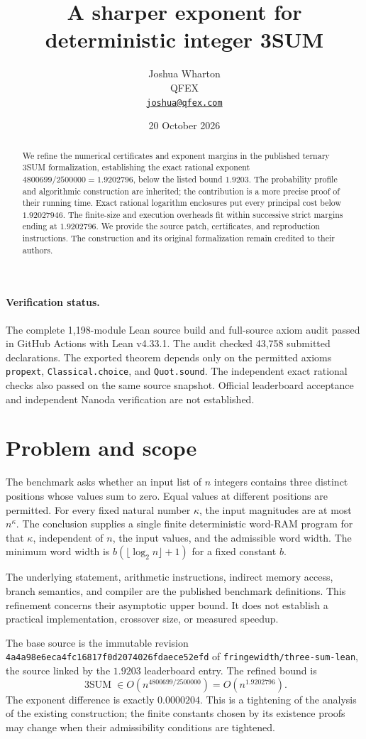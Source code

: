 \documentclass[11pt,a4paper]{article}
\title{A sharper exponent for deterministic integer 3SUM}
\author{Joshua Wharton\\QFEX\\\href{mailto:joshua@qfex.com}{\texttt{joshua@qfex.com}}}
\date{20 October 2026}
\newcommand{\verificationstatus}{The complete 1,198-module Lean source build and full-source axiom audit passed in GitHub Actions with Lean v4.33.1. The audit checked 43,758 submitted declarations. The exported theorem depends only on the permitted axioms \texttt{propext}, \texttt{Classical.choice}, and \texttt{Quot.sound}. The independent exact rational checks also passed on the same source snapshot. Official leaderboard acceptance and independent Nanoda verification are not established.}
\newcommand{\basecommit}{4a4a98e6eca4fc16817f0d2074026fdaece52efd}
\begin{document}
\maketitle
\begin{abstract}
We refine the numerical certificates and exponent margins in the published
ternary 3SUM formalization, establishing the exact rational exponent
$4800699/2500000=1.9202796$, below the listed bound $1.9203$.
The probability profile and algorithmic construction are inherited; the
contribution is a more precise proof of their running time. Exact rational
logarithm enclosures put every principal cost below $1.92027946$.
The finite-size and execution overheads fit within successive strict margins
ending at $1.9202796$. We provide the source patch, certificates, and
reproduction instructions. The construction and its original formalization
remain credited to their authors.
\end{abstract}

\paragraph{Verification status.} \verificationstatus

\section{Problem and scope}
The benchmark asks whether an input list of $n$ integers contains three
distinct positions whose values sum to zero. Equal values at different
positions are permitted. For every fixed natural number $\kappa$, the input
magnitudes are at most $n^\kappa$. The conclusion supplies a single finite
deterministic word-RAM program for that $\kappa$, independent of $n$, the
input values, and the admissible word width. The minimum word width is
$b(\lfloor\log_2 n\rfloor+1)$ for a fixed constant $b$.

The underlying statement, arithmetic instructions, indirect memory access,
branch semantics, and compiler are the published benchmark definitions.
This refinement concerns their asymptotic upper bound. It does not establish
a practical implementation, crossover size, or measured speedup.

The base source is the immutable revision \texttt{\basecommit} of
\texttt{fringewidth/three-sum-lean}, the source linked by the $1.9203$
leaderboard entry. The refined bound is
\[
 \boxed{\operatorname{3SUM}\in O\!\left(n^{4800699/2500000}\right)
       =O(n^{1.9202796}).}
\]
The exponent difference is exactly $0.0000204$. This is a tightening of the
analysis of the existing construction; the finite constants chosen by its
existence proofs may change when their admissibility conditions are tightened.
\end{document}
